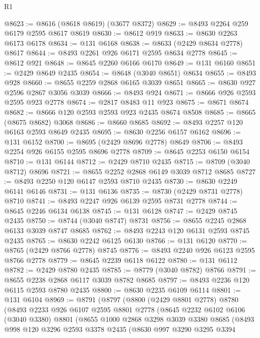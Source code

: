 \begin{lexlean}{R1}
\begin{coremodule}
@8623 := @8616 (@8618 @8619) (@3677 @8372)
@8629 := @8493 @2264 @259 @6179 @2595 @8617 @8619
@8630 := @8612 @919
@8633 := @8630 @2263 @6173 @6178
@8634 := @131 @6168
@8638 := @8633 (@2429 @8634 @2778) @8617
@8644 := @8493 @2261 @926 @6171 @2595 @8634 @2778
@8645 := @8612 @921
@8648 := @8645 @2260 @6166 @6170
@8649 := @131 @6160
@8651 := @2429 @8649 @2435
@8654 := @8648 (@3040 @8651) @8634
@8655 := @8493 @928
@8660 := @8655 @2259 @2868 @6165 @3039 @8651
@8665 := @8630 @927 @2596 @2867 @3056 @3039
@8666 := @8493 @924
@8671 := @8666 @926 @2593 @2595 @923 @2778
@8674 := @2817 @8483 @11 @923
@8675 := @8671 @8674
@8682 := @8666 @120 @2593 @2593 @923 @2435 @8674 @8508
@8685 := @8665 (@8675 @8682) @3068
@8686 := @8660 @8685
@8692 := @8493 @2257 @120 @6163 @2593 @8649 @2435
@8695 := @8630 @2256 @6157 @6162
@8696 := @131 @6152
@8700 := @8695 (@2429 @8696 @2778) @8649
@8706 := @8493 @2254 @926 @6155 @2595 @8696 @2778
@8709 := @8645 @2253 @6150 @6154
@8710 := @131 @6144
@8712 := @2429 @8710 @2435
@8715 := @8709 (@3040 @8712) @8696
@8721 := @8655 @2252 @2868 @6149 @3039 @8712 @8685
@8727 := @8493 @2250 @120 @6147 @2593 @8710 @2435
@8730 := @8630 @2249 @6141 @6146
@8731 := @131 @6136
@8735 := @8730 (@2429 @8731 @2778) @8710
@8741 := @8493 @2247 @926 @6139 @2595 @8731 @2778
@8744 := @8645 @2246 @6134 @6138
@8745 := @131 @6128
@8747 := @2429 @8745 @2435
@8750 := @8744 (@3040 @8747) @8731
@8756 := @8655 @2245 @2868 @6133 @3039 @8747 @8685
@8762 := @8493 @2243 @120 @6131 @2593 @8745 @2435
@8765 := @8630 @2242 @6125 @6130
@8766 := @131 @6120
@8770 := @8765 (@2429 @8766 @2778) @8745
@8776 := @8493 @2240 @926 @6123 @2595 @8766 @2778
@8779 := @8645 @2239 @6118 @6122
@8780 := @131 @6112
@8782 := @2429 @8780 @2435
@8785 := @8779 (@3040 @8782) @8766
@8791 := @8655 @2238 @2868 @6117 @3039 @8782 @8685
@8797 := @8493 @2236 @120 @6115 @2593 @8780 @2435
@8800 := @8630 @2235 @6109 @6114
@8801 := @131 @6104
@8969 := @8791
    (@8797
      (@8800
        (@2429 @8801 @2778)
        @8780
        (@8493
          @2233
          @926
          @6107
          @2595
          @8801
          @2778
          (@8645
            @2232
            @6102
            @6106
            (@3040 @3380)
            @8801
            (@8655
              @1000
              @2868
              @3298
              @3039
              @3380
              @8685
              (@8493
                @998
                @120
                @3296
                @2593
                @3378
                @2435
                (@8630
                  @997
                  @3290
                  @3295
                  @3394

\end{coremodule}
\end{lexlean}
